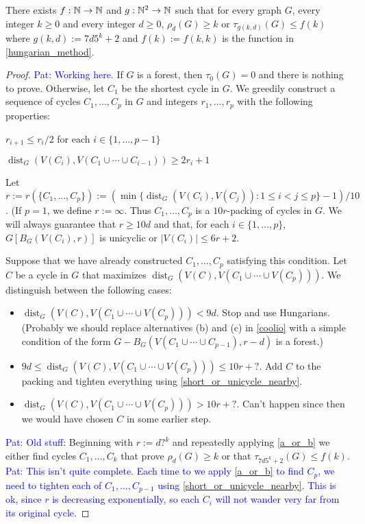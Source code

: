 \documentclass{patmorin}
\newcommand{\pat}[1]{\textcolor{Blue}{Pat: #1}}
\DeclareMathOperator{\dist}{dist}
\begin{document}
\begin{thm}
  There exists $f:\mathbb{N}\to\mathbb{N}$ and $g:\mathbb{N}^2\to\mathbb{N}$ such that for every graph $G$, every integer $k\ge 0$ and every integer $d\ge 0$, $\rho_d(G)\ge k$ or $\tau_{g(k,d)}(G)\le f(k)$ where $g(k,d):=7d5^k+2$ and $f(k):=f(k,k)$ is the function in \cref{hungarian_method}.
\end{thm}

\begin{proof}
  \pat{Working here.}
  If $G$ is a forest, then $\tau_0(G)=0$ and there is nothing to prove. Otherwise, let $C_1$ be the shortest cycle in $G$.  We greedily construct a sequence of cycles $C_1,\ldots,C_p$ in $G$ and integers $r_1,\ldots,r_p$ with the following properties:
  \begin{compactenum}
    \item $r_{i+1}\le r_i/2$ for each $i\in\{1,\ldots,p-1\}$
    \item $\dist_G(V(C_i),V(C_1\cup\cdots\cup C_{i-1}))\ge 2r_i+1$
  \end{compactenum}Let $r:=r(\{C_1,\ldots,C_p\}):=(\min\{\dist_G(V(C_i),V(C_j)): 1\le i < j \le p\}-1)/10$. (If $p=1$, we define $r:=\infty$.  Thus $C_1,\ldots,C_p$ is a $10r$-packing of cycles in $G$.  We will always guarantee that $r\ge 10d$ and that, for each $i\in\{1,\ldots,p\}$, $G[B_G(V(C_i),r)]$ is unicyclic or $|V(C_i)|\le 6r+2$.

  Suppose that we have already constructed $C_1,\ldots,C_p$ satisfying this condition.  Let $C$ be a cycle in $G$ that maximizes $\dist_G(V(C),V(C_1\cup\cdots\cup V(C_p)))$.  We distinguish between the following cases:
  \begin{itemize}
    \item $\dist_G(V(C),V(C_1\cup\cdots\cup V(C_p))) < 9d$.  Stop and use Hungarians.  (Probably we should replace alternatives (b) and (c) in \cref{coolio} with a simple condition of the form $G-B_G(V(C_1\cup\cdots\cup C_{p-1}),r-d)$ is a forest.)
    \item $9d\le \dist_G(V(C),V(C_1\cup\cdots\cup V(C_p)))\le 10r+?$.  Add $C$ to the packing and tighten everything using \cref{short_or_unicycle_nearby}.
    \item $\dist_G(V(C),V(C_1\cup\cdots\cup V(C_p)))> 10r+?$.  Can't happen since then we would have chosen $C$ in some earlier step.
  \end{itemize}
  
  
  

  \pat{Old stuff:}
  Beginning with $r:=d?^k$ and repeatedly applying \cref{a_or_b} we either find cycles $C_1,\ldots,C_k$ that prove $\rho_d(G)\ge k$ or that $\tau_{7d5^k+2}(G) \le f(k)$.  \pat{This isn't quite complete.  Each time to we apply \cref{a_or_b} to find $C_p$, we need to tighten each of $C_1,\ldots,C_{p-1}$ using \cref{short_or_unicycle_nearby}. This is ok, since $r$ is decreasing exponentially, so each $C_i$ will not wander very far from its original cycle.}
\end{proof}
\end{document}
